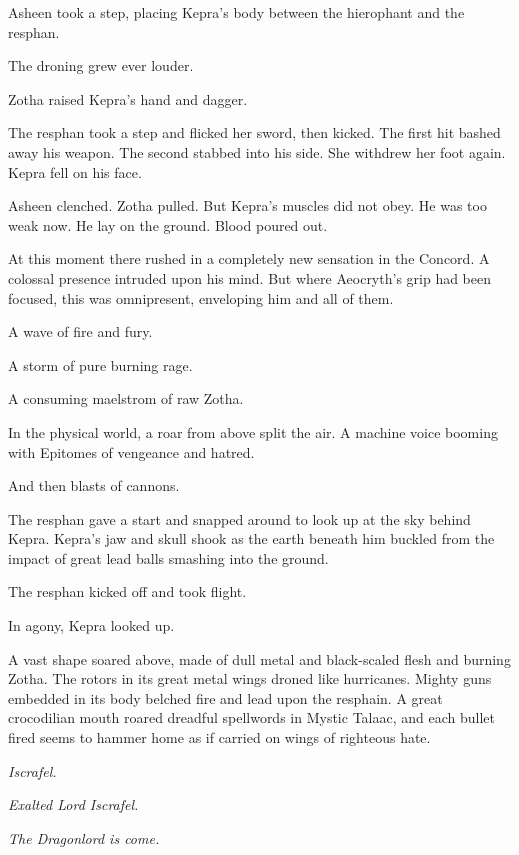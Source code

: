 \documentclass
  [a4paper,
   12pt,
   oneside
  ]%
  {article}
\begin{document}
Asheen took a step, placing Kepra's body between the hierophant and the resphan.

The droning grew ever louder.

Zotha raised Kepra's hand and dagger. 

The resphan took a step and flicked her sword, then kicked. The first hit bashed away his weapon. The second stabbed into his side. 
She withdrew her foot again. 
Kepra fell on his face. 

Asheen clenched. Zotha pulled. But Kepra's muscles did not obey.
He was too weak now.
He lay on the ground.
Blood poured out.

At this moment there rushed in a completely new sensation in the Concord. 
A colossal presence intruded upon his mind.
But where Aeocryth's grip had been focused, this was omnipresent, enveloping him and all of them.

A wave of fire and fury. 

A storm of pure burning rage.

A consuming maelstrom of raw Zotha.

In the physical world, a roar from above split the air. 
A machine voice booming with Epitomes of vengeance and hatred.

And then blasts of cannons. 

The resphan gave a start and snapped around to look up at the sky behind Kepra. 
Kepra's jaw and skull shook as the earth beneath him buckled from the impact of great lead balls smashing into the ground. 

The resphan kicked off and took flight. 

In agony, Kepra looked up. 

A vast shape soared above, made of dull metal and black-scaled flesh and burning Zotha. 
The rotors in its great metal wings droned like hurricanes. 
Mighty guns embedded in its body belched fire and lead upon the resphain. 
A great crocodilian mouth roared dreadful spellwords in Mystic Talaac, and each bullet fired seems to hammer home as if carried on wings of righteous hate. 

\emph{Iscrafel.} 

\emph{Exalted Lord Iscrafel.} 

\emph{The Dragonlord is come.}

% 
% 
\end{document}
